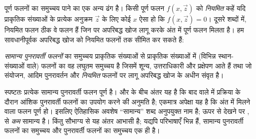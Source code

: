 \documentclass[../../../include/open-logic-section]{subfiles}
\begin{document}

पूर्ण फलनों का समुच्चय पाने का एक अन्य ढंग है। किसी पूर्ण फलन
$f(x,\vec z)$ को \emph{नियमित} कहें यदि प्राकृतिक संख्याओं के प्रत्येक
अनुक्रम $\vec z$ के लिए कोई $x$ ऐसा हो कि $f(x,\vec z) = 0$। दूसरे
शब्दों में, नियमित फलन ठीक वे फलन हैं जिन पर अपरिबद्ध खोज लागू करके अंत
में पूर्ण फलन मिलता है। हम सावधानीपूर्वक अपरिबद्ध खोज को नियमित फलनों तक
सीमित कर सकते हैं:

\begin{defn}
\emph{सामान्य पुनरावर्ती फलनों} का समुच्चय प्राकृतिक संख्याओं से
प्राकृतिक संख्याओं में (विभिन्न स्थान-संख्याओं वाले) फलनों का वह लघुतम
समुच्चय है जिसमें शून्य, उत्तराधिकारी और प्रक्षेपण आते हैं तथा जो संयोजन,
आदिम पुनरावर्तन और \emph{नियमित} फलनों पर लागू अपरिबद्ध खोज के अधीन
संवृत है।
\end{defn}

स्पष्टतः प्रत्येक सामान्य पुनरावर्ती फलन पूर्ण है।
 और  के बीच
अंतर यह है कि बाद वाले में प्रक्रिया के दौरान आंशिक पुनरावर्ती फलनों का
उपयोग करने की अनुमति है; एकमात्र अपेक्षा यह है कि अंत में मिलने वाला फलन
पूर्ण हो। इसलिए ऐतिहासिक अवशेष ``सामान्य'' शब्द अनुपयुक्त नाम है; ऊपर से
देखने पर ,
 से \emph{कम} सामान्य है। किंतु सौभाग्य से
यह अंतर आभासी है; यद्यपि परिभाषाएँ भिन्न हैं, सामान्य पुनरावर्ती फलनों का
समुच्चय और पुनरावर्ती फलनों का समुच्चय एक ही है।
\end{document}
